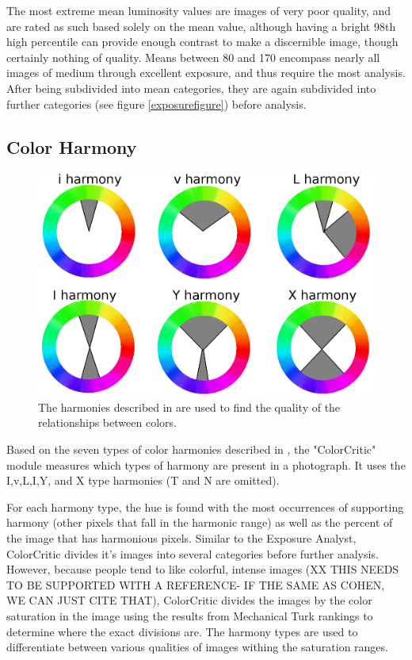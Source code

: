 \documentclass[10pt,twocolumn,letterpaper]{article}
\begin{document}
The most extreme mean luminosity values are images of very poor quality, and are rated as such based solely on the mean value, although having a bright 98th high percentile can provide enough contrast to make a discernible image, though certainly nothing of quality. Means between 80 and 170 encompass nearly all images of medium through excellent exposure, and thus require the most analysis. After being subdivided into mean categories, they are again subdivided into further categories (see figure \ref{exposurefigure}) before analysis.

\subsection{Color Harmony}   
\begin{figure}[t]
  \centering
    \includegraphics[scale=0.38,clip]{colorharmony.eps}
  \caption{The harmonies described in \cite{COL:COL10004} are used to find the quality of the relationships between colors.}
\end{figure}

Based on the seven types of color harmonies described in \cite{Cohen-Or:2006:CH:1179352.1141933}, the "ColorCritic" module measures which types of harmony are present in a photograph. It uses the I,v,L,I,Y, and X type harmonies (T and N are omitted).

For each harmony type, the hue is found with the most occurrences of supporting harmony (other pixels that fall in the harmonic range) as well as the percent of the image that has harmonious pixels. Similar to the Exposure Analyst, ColorCritic divides it's images into several categories before further analysis. However, because people tend to like colorful, intense images (XX THIS NEEDS TO BE SUPPORTED WITH A REFERENCE- IF THE SAME AS COHEN, WE CAN JUST CITE THAT), ColorCritic divides the images by the color saturation in the image using the results from Mechanical Turk rankings to determine where the exact divisions are. The harmony types are used to differentiate between various qualities of images withing the saturation ranges.
\end{document}
